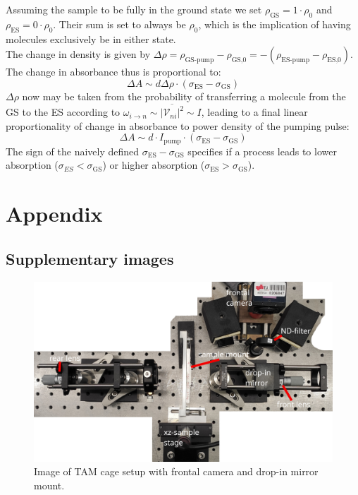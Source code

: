 \documentclass[twoside,openright,listof=numbered]{scrreprt}
\begin{document}
Assuming the sample to be fully in the ground state we set $\rho _\text{GS} = 1\cdot \rho_0$ and $\rho_\text{ES} = 0 \cdot \rho_0$. Their sum is set to always be $\rho_0$, which is the implication of having molecules exclusively be in either state.\\
The change in density is given by $\Delta \rho = \rho_\text{GS-pump} - \rho_\text{GS,0} = - \left(\rho_\text{ES-pump} - \rho_\text{ES,0}\right)$. The change in absorbance thus is proportional to:
\begin{equation}
\Delta A \sim d \Delta \rho\cdot\left(\sigma_\text{ES}-\sigma_\text{GS}\right)
\end{equation}
$\Delta \rho$ now may be taken from the probability of transferring a molecule from the GS to the ES according to $\omega_{i\rightarrow n}\sim  \overline{\lvert \mathcal{V}_{ni}\rvert^2}\sim I$, leading to a final linear proportionality of change in absorbance to power density of the pumping pulse:
\begin{equation}
\Delta A \sim d\cdot I_\text{pump}\cdot\left(\sigma_\text{ES}-\sigma_\text{GS}\right)
\end{equation}
The sign of the naively defined $\sigma_\text{ES} - \sigma_\text{GS}$ specifies if a process leads to lower absorption ($\sigma_{ES} < \sigma_\text{GS}$) or higher absorption ($\sigma_\text{ES} > \sigma_\text{GS}$).

\chapter{Appendix}
\section*{Supplementary images}
\begin{figure}[hbtp]
\centering
\includegraphics[width=0.6\linewidth]{images/TAM/CroppedTAM_setup.jpg}
\caption{Image of TAM cage setup with frontal camera and drop-in mirror mount.}
\end{figure}
\end{document}
